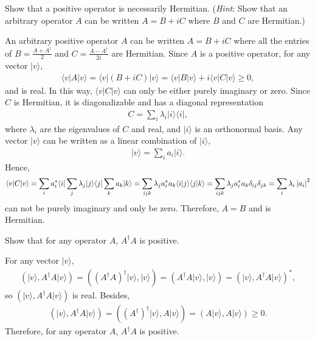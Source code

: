 \documentclass[en]{sol-man}
\begin{document}
\begin{exe}
    Show that a positive operator is necessarily Hermitian. (\emph{Hint}: Show that an arbitrary operator $A$ can be written $A=B+iC$ where $B$ and $C$ are Hermitian.)
\end{exe}
\begin{pf}
    An arbitrary positive operator $A$ can be written $A=B+iC$ where all the entries of $B=\frac{A+A^{\dagger}}{2}$ and $C=\frac{A-A^{\dagger}}{2i}$ are Hermitian. Since $A$ is a positive operator, for any vector $\lvert v\rangle$,
    \begin{align}
        \langle v\rvert A\lvert v\rangle=\langle v\rvert(B+iC)\lvert v\rangle=\langle v\rvert B\lvert v\rangle+i\langle v\rvert C\lvert v\rangle\geq 0,
    \end{align}
    and is real. In this way, $\langle v\rvert C\lvert v\rangle$ can only be either purely imaginary or zero. Since $C$ is Hermitian, it is diagonalizable and has a diagonal representation
    \begin{align}
        C=\sum_i\lambda_i\lvert i\rangle\langle i\rvert,
    \end{align}
    where $\lambda_i$ are the eigenvalues of $C$ and real, and $\lvert i\rangle$ is an orthonormal basis. Any vector $\lvert v\rangle$ can be written as a linear combination of $\lvert i\rangle$,
    \begin{align}
        \lvert v\rangle=\sum_ia_i\lvert i\rangle.
    \end{align}
    Hence,
    \begin{align}
        \langle v\rvert C\lvert v\rangle=\sum_ia_i^*\langle i\rvert \sum_j\lambda_j\lvert j\rangle\langle j\rvert\sum_ka_k\lvert k\rangle=\sum_{ijk}\lambda_ja_i^*a_k\langle i\vert j\rangle\langle j\vert k\rangle=\sum_{ijk}\lambda_ja_i^*a_k\delta_{ij}\delta_{jk}=\sum_i\lambda_i\left\lvert a_i\right\rvert^2
    \end{align}
    can not be purely imaginary and only be zero. Therefore, $A=B$ and is Hermitian.
\end{pf}

\begin{exe}
    Show that for any operator $A$, $A^{\dagger}A$ is positive.
\end{exe}
\begin{pf}
    For any vector $\lvert v\rangle$,
    \begin{align}
        (\lvert v\rangle,A^{\dagger}A\lvert v\rangle)=((A^{\dagger}A)^{\dagger}\lvert v\rangle,\lvert v\rangle)=(A^{\dagger}A\lvert v\rangle,\lvert v\rangle)=(\lvert v\rangle,A^{\dagger}A\lvert v\rangle)^*,
    \end{align}
    so $(\lvert v\rangle,A^{\dagger}A\lvert v\rangle)$ is real. Besides,
    \begin{align}
        (\lvert v\rangle,A^{\dagger}A\lvert v\rangle)=((A^{\dagger})^{\dagger}\lvert v\rangle,A\lvert v\rangle)=(A\lvert v\rangle,A\lvert v\rangle)\geq 0.
    \end{align}
    Therefore, for any operator $A$, $A^{\dagger}A$ is positive.
\end{pf}
\end{document}
